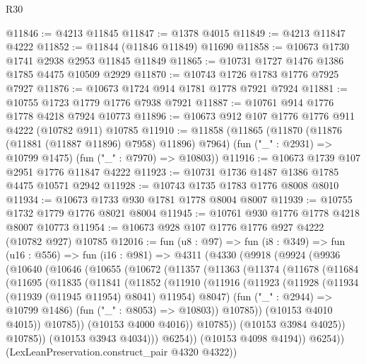 \begin{lexlean}{R30}
\begin{coremodule}
{{{{{@11846 := @4213 @11845
@11847 := @1378 @4015
@11849 := @4213 @11847 @4222
@11852 := @11844 (@11846 @11849) @11690
@11858 := @10673 @1730 @1741 @2938 @2953 @11845 @11849
@11865 := @10731 @1727 @1476 @1386 @1785 @4475 @10509 @2929
@11870 := @10743 @1726 @1783 @1776 @7925 @7927
@11876 := @10673 @1724 @914 @1781 @1778 @7921 @7924
@11881 := @10755 @1723 @1779 @1776 @7938 @7921
@11887 := @10761 @914 @1776 @1778 @4218 @7924 @10773
@11896 := @10673 @912 @107 @1776 @1776 @911 @4222 (@10782 @911) @10785
@11910 := @11858
    (@11865
      (@11870 (@11876 (@11881 (@11887 @11896) @7958) @11896) @7964)
      (fun ("_" : @2931) => @10799 @1475)
      (fun ("_" : @7970) => @10803))
@11916 := @10673 @1739 @107 @2951 @1776 @11847 @4222
@11923 := @10731 @1736 @1487 @1386 @1785 @4475 @10571 @2942
@11928 := @10743 @1735 @1783 @1776 @8008 @8010
@11934 := @10673 @1733 @930 @1781 @1778 @8004 @8007
@11939 := @10755 @1732 @1779 @1776 @8021 @8004
@11945 := @10761 @930 @1776 @1778 @4218 @8007 @10773
@11954 := @10673 @928 @107 @1776 @1776 @927 @4222 (@10782 @927) @10785
@12016 := fun (u8 : @97) =>
  fun (i8 : @349) =>
  fun (u16 : @556) =>
  fun (i16 : @981) =>
  @4311
    (@4330
      (@9918
        (@9924
          (@9936
            (@10640
              (@10646
                (@10655
                  (@10672
                    (@11357
                      (@11363
                        (@11374
                          (@11678
                            (@11684
                              (@11695
                                (@11835
                                  (@11841
                                    (@11852
                                      (@11910
                                        (@11916
                                          (@11923
                                            (@11928
                                              (@11934 (@11939 (@11945 @11954) @8041) @11954)
                                              @8047)
                                            (fun ("_" : @2944) => @10799 @1486)
                                            (fun ("_" : @8053) => @10803))
                                          @10785))
                                      (@10153 @4010 @4015))
                                    @10785))
                                (@10153 @4000 @4016))
                              @10785))
                          (@10153 @3984 @4025))
                        @10785))
                    (@10153 @3943 @4034)))
                @6254))
            (@10153 @4098 @4194))
          @6254))
      (LexLeanPreservation.construct_pair @4320 @4322))
}}}}}
\end{coremodule}
\end{lexlean}
